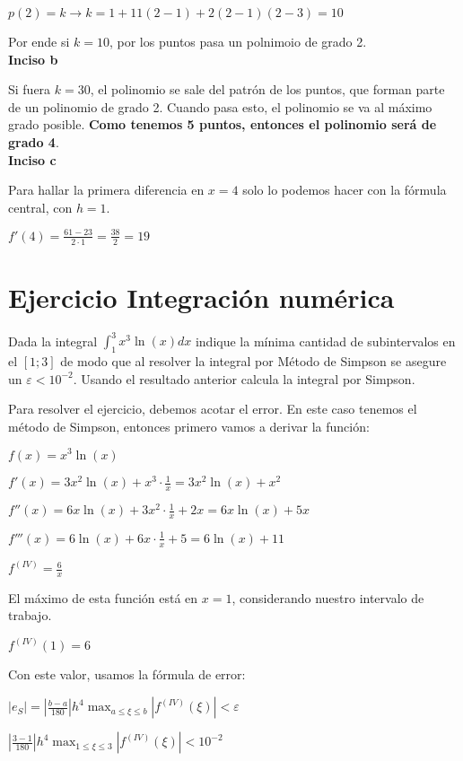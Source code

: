 \documentclass[11pt]{article}
\begin{document}
	$p(2)=k \rightarrow k=1+11(2-1)+2(2-1)(2-3)=10$
	
	Por ende si $k=10$, por los puntos pasa un polnimoio de grado 2.\\
	
	\textbf{Inciso b}
	
	Si fuera $k=30$, el polinomio se sale del patrón de los puntos, que forman parte de un polinomio de grado 2. Cuando pasa esto, el polinomio se va al máximo grado posible. \textbf{Como tenemos 5 puntos, entonces el polinomio será de grado 4}.\\
	
	\textbf{Inciso c}
	
	Para hallar la primera diferencia en $x=4$ solo lo podemos hacer con la fórmula central, con $h=1$.
	
	$\displaystyle f'(4)=\frac{61-23}{2\cdot1}=\frac{38}{2}=19$
	
	\section{Ejercicio Integración numérica}
	Dada la integral $\displaystyle \int_{1}^{3}x^3\ln(x)dx$ indique la mínima cantidad de subintervalos en el $[1;3]$ de modo que al resolver la integral por Método de Simpson se asegure un $\varepsilon<10^{-2}$. Usando el resultado anterior calcula la integral por Simpson.
	
	Para resolver el ejercicio, debemos acotar el error. En este caso tenemos el método de Simpson, entonces primero vamos a derivar la función:
	
	$f(x)=x^3\ln(x)$
	
	$\displaystyle f'(x)=3x^2 \ln(x) + x^3\cdot \frac{1}{x}=3x^2\ln(x)+x^2$
	
	$\displaystyle f''(x)=6x\ln(x)+3x^2 \cdot \frac{1}{x}+2x=6x\ln(x)+5x$
	
	$\displaystyle f'''(x)=6\ln(x)+6x\cdot \frac{1}{x}+5=6\ln(x)+11$
	
	$\displaystyle f^{(IV)}=\frac{6}{x}$
	
	El máximo de esta función está en $x=1$, considerando nuestro intervalo de trabajo.
	
	$f^{(IV)}(1)=6$
	
	Con este valor, usamos la fórmula de error:
	
	$\displaystyle |e_S|=\left| \frac{b-a}{180} \right|h^4 \max_{a\le \xi \le b}  \left|f^{(IV)}(\xi) \right|<\varepsilon$
	
	$\displaystyle \left|\frac{3-1}{180}\right|h^4 \max_{1\le \xi \le 3}  \left|f^{(IV)}(\xi) \right|<10^{-2}$
	
\end{document}
